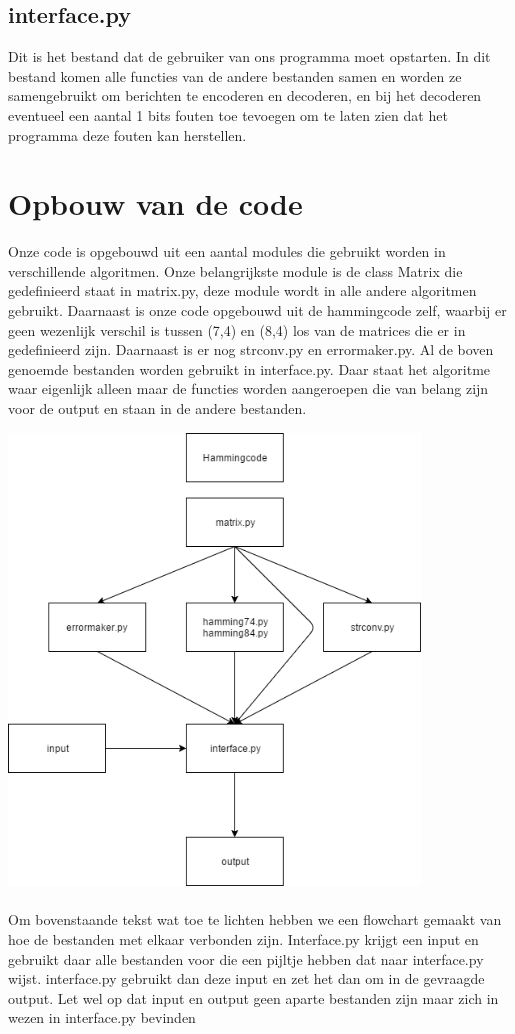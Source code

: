 \documentclass[a4paper]{article}
\begin{document}
\subsection{interface.py}
	Dit is het bestand dat de gebruiker van ons programma moet opstarten. In dit bestand komen alle functies van de andere bestanden samen en worden ze samengebruikt om berichten te encoderen en decoderen, en bij het decoderen eventueel een aantal 1 bits fouten toe tevoegen om te laten zien dat het programma deze fouten kan herstellen.
	
\section{Opbouw van de code}
Onze code is opgebouwd uit een aantal modules die gebruikt worden in verschillende algoritmen. Onze belangrijkste module is de class Matrix die gedefinieerd staat in matrix.py, deze module wordt in alle andere algoritmen gebruikt. Daarnaast is onze code opgebouwd uit de hammingcode zelf, waarbij er geen wezenlijk verschil is tussen (7,4) en (8,4) los van de matrices die er in gedefinieerd zijn. Daarnaast is er nog strconv.py en errormaker.py. Al de boven genoemde bestanden worden gebruikt in interface.py. Daar staat het algoritme waar eigenlijk alleen maar de functies worden aangeroepen die van belang zijn voor de output en staan in de andere bestanden.

\includegraphics[height=12cm]{diagram}
\\
\\
Om bovenstaande tekst wat toe te lichten hebben we een flowchart gemaakt van hoe de bestanden met elkaar verbonden zijn. Interface.py krijgt een input en gebruikt daar alle bestanden voor die een pijltje hebben dat naar interface.py wijst. interface.py gebruikt dan deze input en zet het dan om in de gevraagde output. Let wel op dat input en output geen aparte bestanden zijn maar zich in wezen in interface.py bevinden
\end{document}
